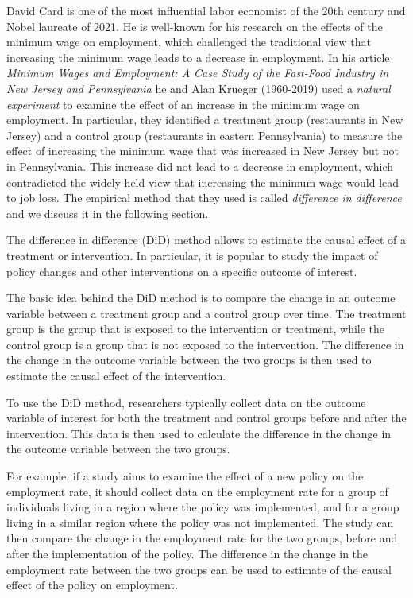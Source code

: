 \documentclass[
  12pt,
  oneside]{book}
\theoremstyle{definition}
\theoremstyle{definition}
\theoremstyle{definition}
\theoremstyle{definition}
\theoremstyle{remark}
\begin{document}
David Card is one of the most influential labor economist of the 20th century and Nobel laureate of 2021. He is well-known for his research on the effects of the minimum wage on employment, which challenged the traditional view that increasing the minimum wage leads to a decrease in employment. In his article \emph{Minimum Wages and Employment: A Case Study of the Fast-Food Industry in New Jersey and Pennsylvania} \citep{Card1994Minimum} he and Alan Krueger (1960-2019) used a \emph{natural experiment} to examine the effect of an increase in the minimum wage on employment. In particular, they identified a treatment group (restaurants in New Jersey) and a control group (restaurants in eastern Pennsylvania) to measure the effect of increasing the minimum wage that was increased in New Jersey but not in Pennsylvania. This increase did not lead to a decrease in employment, which contradicted the widely held view that increasing the minimum wage would lead to job loss.
The empirical method that they used is called \emph{difference in difference} and we discuss it in the following section.

The difference in difference (DiD) method allows to estimate the causal effect of a treatment or intervention. In particular, it is popular to study the impact of policy changes and other interventions on a specific outcome of interest.

The basic idea behind the DiD method is to compare the change in an outcome variable between a treatment group and a control group over time. The treatment group is the group that is exposed to the intervention or treatment, while the control group is a group that is not exposed to the intervention. The difference in the change in the outcome variable between the two groups is then used to estimate the causal effect of the intervention.

To use the DiD method, researchers typically collect data on the outcome variable of interest for both the treatment and control groups before and after the intervention. This data is then used to calculate the difference in the change in the outcome variable between the two groups.

For example, if a study aims to examine the effect of a new policy on the employment rate, it should collect data on the employment rate for a group of individuals living in a region where the policy was implemented, and for a group living in a similar region where the policy was not implemented. The study can then compare the change in the employment rate for the two groups, before and after the implementation of the policy. The difference in the change in the employment rate between the two groups can be used to estimate of the causal effect of the policy on employment.
\end{document}
